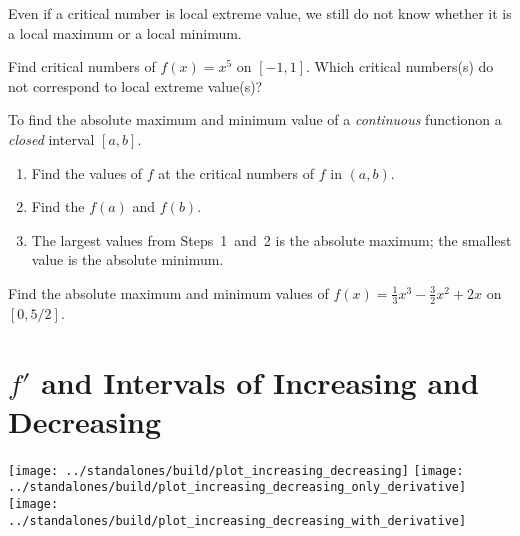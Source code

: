 \documentclass[../main.tex]{subfiles}
\begin{document}
\faExclamationTriangle{} Even if a critical number is local extreme value, we still do not know whether it is a local maximum or a local minimum.
\vspace{1in}

\begin{example} \label{ref:ex-critical-numbers}
  Find critical numbers of \(f(x) = x^{5}\) on \([-1,1]\). Which critical numbers(s) do not correspond to local extreme value(s)?
\end{example}
\vfill
\clearpage

\begin{mdframed}[style=withref]
  To find the absolute maximum and minimum value of a \emph{continuous} functionon a \emph{closed} interval \([a,b]\).
  \begin{enumerate}
  \item Find the values of \(f\) at the critical numbers of \(f\) in \((a,b)\).
  \item Find the \(f(a)\) and \(f(b)\).
  \item The largest values from Steps~1~and~2 is the absolute maximum; the smallest value is the absolute minimum.
  \end{enumerate}

\end{mdframed}

\begin{example}
  Find the absolute maximum and minimum values of \(f(x) = \frac{1}{3} x^{3} - \frac{3}{2} x^{2} + 2x\) on \([0,5/2]\).
\end{example}
\vfill
\clearpage
%

\section{\(f'\) and Intervals of Increasing and Decreasing}
\begin{center}
  \texttt{[image: ../standalones/build/plot\_increasing\_decreasing]}
  \hfill
  \texttt{[image: ../standalones/build/plot\_increasing\_decreasing\_only\_derivative]}
  \hfill
  \texttt{[image: ../standalones/build/plot\_increasing\_decreasing\_with\_derivative]}
\end{center}
\vspace{1in}
\end{document}
